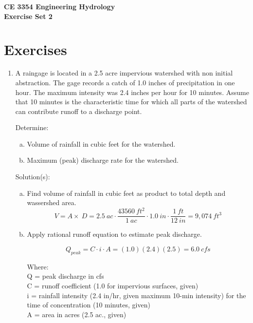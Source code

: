 \documentclass[12pt]{article}
\begin{document}
\begin{center}
{\textbf{{ CE 3354 Engineering Hydrology} \\ {Exercise Set 2}}}
\end{center}

\section*{\small{Exercises}}
\begin{enumerate}
\item A raingage is located in a 2.5 acre impervious watershed with non initial abstraction.  The gage records a catch of 1.0 inches of precipitation in one hour.  The maximum intensity was 2.4 inches per hour for 10 minutes.  Assume that 10 minutes is the characteristic time for which all parts of the watershed can contribute runoff to a discharge point.

Determine:
    \begin{enumerate}[a)]
        \item Volume of rainfall in cubic feet for the watershed. 
        \item Maximum (peak) discharge rate for the watershed.
    \end{enumerate}

Solution(s):


\begin{enumerate}[a)]
\item Find volume of rainfall in cubic feet as product to total depth and wassershed area.
\begin{equation}
V=A \times\ D = 2.5~ac \cdot \frac{43560~ft^2}{1~ac} \cdot 1.0~in \cdot \frac{1~ft}{12~in} = 9,074~ft^3
\end{equation}
\item Apply rational runoff equation to estimate peak discharge.

\begin{equation}
Q_{peak} = C \cdot i\cdot A = (1.0)(2.4)(2.5) = 6.0~cfs
\end{equation}

Where:\\
Q = peak discharge in cfs\\
C = runoff coefficient (1.0 for impervious surfaces, given)\\
i = rainfall intensity (2.4 in/hr, given maximum 10-min intensity) for the time of concentration (10 minutes, given)\\
A = area in acres (2.5 ac., given)\\


\end{enumerate}
\end{enumerate}
\end{document}
